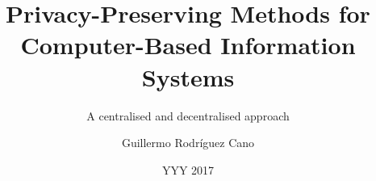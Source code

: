 \title{Privacy-Preserving Methods for\\ Computer-Based Information Systems}
\subtitle{A centralised and decentralised approach}
\author{Guillermo Rodr{\'i}guez Cano}
\date{YYY 2017}
\address{
    KTH Royal Institute of Technology\\
    School of Computer Science and Communication\\
    SE-100 44 Stockholm\\
    SWEDEN}


\newcommand{\thesisauthor}{\theauthor}                                        %
\newcommand{\thesiscontactemail}{gurc@kth.se}
\newcommand{\thesissupervisor}{Sonja Buchegger and Johan Boye}                              %
\newcommand{\thesissupervisorcover}{\thesissupervisor}                         %

\newcommand{\thesistitle}{\thetitle}                  %
\newcommand{\thesistitleshort}{\thesistitle}                                                    %
\newcommand{\thesislanguage}{EN}
\newcommand{\thesiscopyright}{Copyright (C) 2017, \thesisauthor}                                %
\newcommand{\thesislicense}{Creative Commons (by-nc-sa) 3.0 Sweden}                             %
\newcommand{\thesislicenseurl}{http://creativecommons.org/licenses/by-nc-sa/3.0/se/legalcode}   %
\newcommand{\thesiskeywords}{TODO}
\newcommand{\thesiskeywordsabstracten}{TODO}
\endinput
